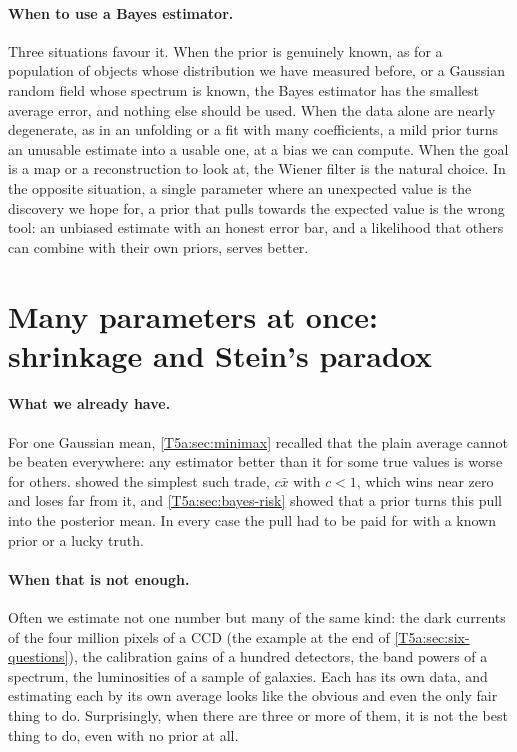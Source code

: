 \paragraph{When to use a Bayes estimator.}
Three situations favour it. When the prior is genuinely known, as for a
population of objects whose distribution we have measured before, or a
Gaussian random field whose spectrum is known, the Bayes estimator has the
smallest average error, and nothing else should be used. When the data alone
are nearly degenerate, as in an unfolding or a fit with many coefficients,
a mild prior turns an unusable estimate into a usable one, at a bias we can
compute. When the goal is a map or a reconstruction to look at, the Wiener
filter is the natural choice. In the opposite situation, a single parameter
where an unexpected value is the discovery we hope for, a prior that pulls
towards the expected value is the wrong tool: an unbiased estimate with an
honest error bar, and a likelihood that others can combine with their own
priors, serves better.
\section{Many parameters at once: shrinkage and Stein's paradox}
\label{T5a:sec:stein}

\paragraph{What we already have.}
For one Gaussian mean, \cref{T5a:sec:minimax} recalled that the plain average
cannot be beaten everywhere: any estimator better than it for some true
values is worse for others.  showed the simplest such
trade, $c\bar x$ with $c<1$, which wins near zero and loses far from it, and
\cref{T5a:sec:bayes-risk} showed that a prior turns this pull into the
posterior mean. In every case the pull had to be paid for with a known prior
or a lucky truth.

\paragraph{When that is not enough.}
Often we estimate not one number but many of the same kind: the dark
currents of the four million pixels of a CCD (the example at the end of
\cref{T5a:sec:six-questions}), the calibration gains of a hundred detectors,
the band powers of a spectrum, the luminosities of a sample of galaxies.
Each has its own data, and estimating each by its own average looks like
the obvious and even the only fair thing to do. Surprisingly, when there are
three or more of them, it is not the best thing to do, even with no prior at
all.

